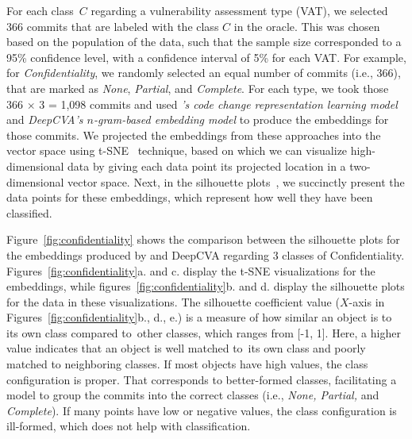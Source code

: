 For each class~$C$ regarding a vulnerability assessment type (VAT), we
selected 366 commits that are labeled with the class $C$ in the
oracle. This was chosen based on the population of the data, such that the sample size corresponded to a 95\% confidence level, with a confidence interval of 5\% for each VAT. 
For example, for {\em Confidentiality}, we randomly selected
an equal number of commits (i.e., 366), that are marked as {\em None}, {\em Partial}, and {\em Complete}.
For each type, we took those 366 $\times$ 3 = 1,098 commits and used
{\em {\tool}'s code change representation learning model} and {\em DeepCVA's
$n$-gram-based embedding model} to produce the embeddings for
those commits.  We projected the embeddings from these approaches
into the vector space using t-SNE~\cite{tsne} technique, based on which we can visualize high-dimensional data by giving
each data point its projected location in a two-dimensional vector
space. Next, in the silhouette plots~\cite{silhouette-plot}, we succinctly present the data points for these embeddings, which represent how well they have
been classified.

Figure~\ref{fig:confidentiality} shows the comparison between the
silhouette plots for the embeddings produced by {\tool} and DeepCVA
regarding 3 classes of
Confidentiality. Figures~\ref{fig:confidentiality}a. and c. display
the t-SNE visualizations for the embeddings, while
figures~\ref{fig:confidentiality}b. and d. display the silhouette
plots for the data in these visualizations.
The silhouette coefficient value ($X$-axis in
Figures~\ref{fig:confidentiality}b., d., e.) is a measure of how
similar an object is to its own class compared to~other classes, which ranges from [-1, 1]. Here, a higher value
indicates that an object is well matched to~its own class and poorly
matched to neighboring classes. If most objects have high values, the
class configuration is proper. That corresponds
to better-formed classes, facilitating a model to group the commits
into the correct classes (i.e., {\em None, Partial,} and {\em Complete}).
If many points have low or negative values, the
class configuration is ill-formed, which does not help with
classification.


